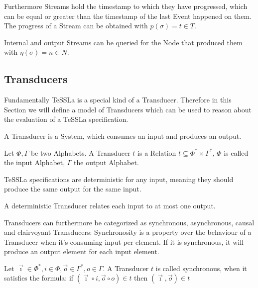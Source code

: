 Furthermore Streams hold the timestamp to which they have progressed, which can be equal or greater than the timestamp of the last Event happened on them.
The progress of a Stream can be obtained with \(p(\sigma) = t \in T\).

Internal and output Streams can be queried for the Node that produced them with \(\eta(\sigma) = n \in N\).

\subsection{Transducers}
\label{sec:concepts:defs:transducers}

Fundamentally TeSSLa is a special kind of a Transducer.
Therefore in this Section we will define a model of Transducers which can be used to reason about the evaluation of a TeSSLa specification.

A Transducer is a System, which consumes an input and produces an output.

\begin{definition}[name = Transducer]\label{def:transducer}
  Let \(\Phi, \Gamma\) be two Alphabets.
  A Transducer \(t\) is a Relation \(t \subseteq \Phi^* \times \Gamma^*\), \(\Phi\) is called the input Alphabet, \(\Gamma\) the output Alphabet.
\end{definition}

TeSSLa specifications are deterministic for any input, meaning they should produce the same output for the same input.

\begin{definition}[name = Deterministic Transducer]\label{def:deterministic_transducer}
  A deterministic Transducer relates each input to at most one output.
\end{definition}

Transducers can furthermore be categorized as synchronous, asynchronous, causal and clairvoyant Transducers:
Synchronosity is a property over the behaviour of a Transducer when it's consuming input per element.
If it is synchronous, it will produce an output element for each input element.

\begin{definition}[name = Synchronous Transducer]\label{def:synchronous_transducer}
Let \(\vec{\imath} \in \Phi^*, i \in \Phi, \vec{o} \in \Gamma^*, o \in \Gamma\).
  A Transducer \(t\) is called synchronous, when it satisfies the formula:
  if \( (\vec{\imath}\circ i,\vec{o}\circ o) \in t\)
  then \( (\vec{\imath}, \vec{o}) \in t \)
\end{definition}

